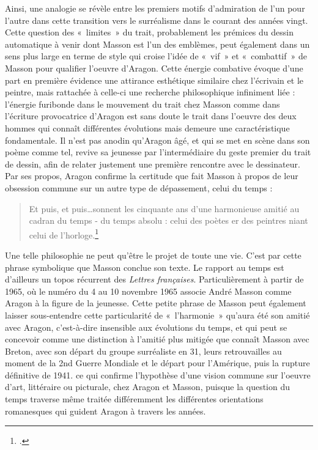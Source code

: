 	Ainsi, une analogie se révèle entre les premiers motifs d’admiration de l’un pour l’autre dans cette transition vers le surréalisme dans le courant des années vingt. Cette question des « limites » du trait, probablement les prémices du dessin automatique à venir dont Masson est l’un des emblèmes, peut également dans un sens plus large en terme de style qui croise l’idée de « vif » et « combattif » de Masson pour qualifier l’oeuvre d’Aragon. Cette énergie combative évoque d’une part en première évidence une attirance esthétique similaire chez l’écrivain et le peintre, mais rattachée à celle-ci une recherche philosophique infiniment liée : l’énergie furibonde dans le mouvement du trait chez Masson comme dans l’écriture provocatrice d’Aragon est sans doute le trait dans l’oeuvre des deux hommes qui connaît différentes évolutions mais demeure une caractéristique fondamentale. Il n’est pas anodin qu’Aragon âgé, et qui se met en scène dans son poème comme tel, revive sa jeunesse par l’intermédiaire du geste premier du trait de dessin, afin de relater justement une première rencontre avec le dessinateur. Par ses propos, Aragon confirme la certitude que fait Masson à propos de leur obsession commune sur un autre type de dépassement, celui du temps : 
\begin{verse}    
Et puis, et puis…sonnent les cinquante ans d’une harmonieuse amitié au cadran du temps - du temps absolu : celui des poètes er des peintres niant celui de l’horloge.\footcite[p84]{rebelle}\end{verse}


	Une telle philosophie ne peut qu’être le projet de toute une vie. C’est par cette phrase symbolique que Masson conclue son texte. Le rapport au temps est d’ailleurs un topos récurrent des \emph{Lettres françaises}. Particulièrement à partir de 1965, où le numéro du 4 au 10 novembre 1965 associe André Masson comme Aragon à la figure de la jeunesse. Cette petite phrase de Masson peut également laisser sous-entendre cette particularité de « l’harmonie » qu’aura été son amitié avec Aragon, c’est-à-dire insensible aux  évolutions du temps, et qui peut se concevoir comme une distinction à l’amitié plus mitigée que connaît Masson avec Breton, avec son départ du groupe surréaliste en 31, leurs retrouvailles au moment de la 2nd Guerre Mondiale et le départ pour l’Amérique, puis la rupture définitive de 1941. ce qui confirme l’hypothèse d’une vision commune sur l’oeuvre d’art, littéraire ou picturale, chez Aragon et Masson, puisque la question du temps traverse même traitée différemment les différentes orientations romanesques qui guident Aragon à travers les années.

